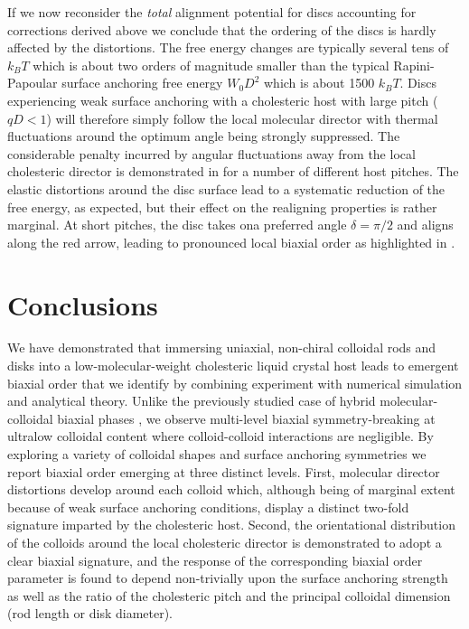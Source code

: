  If we now reconsider the {\em total} alignment potential for discs accounting for corrections derived above we conclude that the ordering of the discs is hardly affected by the distortions. The free energy changes are typically several tens of $k_{B}T$ which is about two orders of magnitude smaller than the typical Rapini-Papoular surface anchoring free energy $ W_{0} D^{2} $ which is about 1500 $k_{B}T$. Discs experiencing weak surface anchoring with  a cholesteric host with large pitch ($qD <1$)  will therefore simply follow the local molecular director with thermal fluctuations around the optimum angle being strongly suppressed. The considerable penalty incurred  by angular fluctuations away from the local cholesteric director is demonstrated in  for a number of different host pitches. The elastic distortions around the disc surface lead to a systematic reduction of the free energy, as expected, but their effect on the realigning properties is rather marginal. At short pitches, the disc takes ona preferred angle $\delta = \pi/2$ and aligns along the red arrow, leading to pronounced local biaxial order as highlighted in . 


 


\section{Conclusions}


We have  demonstrated that immersing uniaxial, non-chiral colloidal rods and disks into a low-molecular-weight cholesteric liquid crystal host leads to emergent biaxial order that we identify by combining experiment with numerical simulation and analytical theory. Unlike the previously studied case of hybrid molecular-colloidal biaxial phases \cite{liu2016,mundoor2021,mundoor2018}, we observe multi-level biaxial symmetry-breaking at ultralow colloidal content where colloid-colloid interactions are negligible. By exploring a variety of colloidal shapes and surface anchoring symmetries we report biaxial order emerging at three distinct levels. First, molecular director distortions develop around each colloid which, although being of marginal extent because of weak surface anchoring conditions, display a distinct two-fold signature imparted by the cholesteric host. Second, the orientational distribution of the colloids around the local cholesteric director is demonstrated to adopt a clear biaxial signature, and the response of the corresponding biaxial order parameter is found to depend non-trivially upon the surface anchoring strength as well as the ratio of the cholesteric pitch and the principal colloidal dimension (rod length or disk diameter). 

